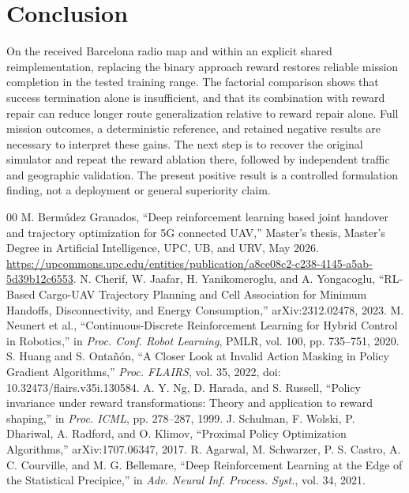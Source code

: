 \documentclass[conference]{IEEEtran}
\begin{document}
\section{Conclusion}
On the received Barcelona radio map and within an explicit shared
reimplementation, replacing the binary approach reward restores reliable
mission completion in the tested training range. The factorial comparison shows
that success termination alone is insufficient, and that its combination with
reward repair can reduce longer route generalization relative to reward repair
alone. Full mission outcomes, a deterministic reference, and retained negative
results are necessary to interpret these gains. The next step is to recover
the original simulator and repeat the reward ablation there, followed by
independent traffic and geographic validation. The present positive result is
a controlled formulation finding, not a deployment or general superiority claim.



\begin{thebibliography}{00}
 M. Berm\'udez Granados, ``Deep reinforcement learning based joint
handover and trajectory optimization for 5G connected UAV,'' Master's thesis,
Master's Degree in Artificial Intelligence, UPC, UB, and URV, May 2026.
\url{https://upcommons.upc.edu/entities/publication/a8ce08c2-c238-4145-a5ab-5d39b12c6553}.
 N. Cherif, W. Jaafar, H. Yanikomeroglu, and A. Yongacoglu,
``RL-Based Cargo-UAV Trajectory Planning and Cell Association for Minimum
Handoffs, Disconnectivity, and Energy Consumption,'' arXiv:2312.02478, 2023.
 M. Neunert et al., ``Continuous-Discrete Reinforcement Learning
for Hybrid Control in Robotics,'' in \emph{Proc. Conf. Robot Learning},
PMLR, vol. 100, pp. 735--751, 2020.
 S. Huang and S. Onta\~n\'on, ``A Closer Look at Invalid Action
Masking in Policy Gradient Algorithms,'' \emph{Proc. FLAIRS}, vol. 35, 2022,
doi: 10.32473/flairs.v35i.130584.
 A. Y. Ng, D. Harada, and S. Russell, ``Policy invariance under
reward transformations: Theory and application to reward shaping,'' in
\emph{Proc. ICML}, pp. 278--287, 1999.
 J. Schulman, F. Wolski, P. Dhariwal, A. Radford, and O. Klimov,
``Proximal Policy Optimization Algorithms,'' arXiv:1707.06347, 2017.
 R. Agarwal, M. Schwarzer, P. S. Castro, A. C. Courville,
and M. G. Bellemare, ``Deep Reinforcement Learning at the Edge of the
Statistical Precipice,'' in \emph{Adv. Neural Inf. Process. Syst.}, vol. 34, 2021.
\end{thebibliography}
\end{document}
